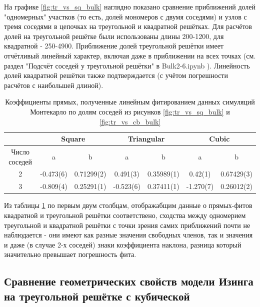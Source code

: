На графике \ref{fig:tr_vs_sq_bulk} наглядно показано сравнение приближений долей "одномерных" участков (то есть, долей мономеров с двумя соседями) и узлов с тремя соседями в цепочках на треугольной и квадратной решётках. Для расчётов долей на треугольной решётке были использованы длины 200-1200, для квадратной - 250-4900. Приближение долей треугольной решётки имеет отчётливый линейный характер, включая даже в приближении на всех точках (см. раздел "Подсчёт соседей у треугольной решётки" в Bulk2-6.ipynb \cite{web:ProjectMagnetRepos} ). Линейность долей квадратной решётки также подтверждается (с учётом погрешности расчётов с наибольшей длиной). 

\begin{table}[]
    \centering
    \begin{tabular}{|c|c|c|c|c|c|c|} \hline
        & \multicolumn{2}{|c|}{Square} & \multicolumn{2}{|c|}{Triangular} & \multicolumn{2}{|c|}{Cubic} \\ \hline
        Число соседей & a & b & a & b & a & b \\ \hline
        2 & -0.473(6) & 0.71299(2) & 0.491(3) & 0.35989(1) & 0.42(1) & 0.67429(3) \\ \hline
        3 & -0.809(4) & 0.25291(1) & -0.523(6) & 0.37411(1) & -1.270(7) & 0.26012(2) \\ \hline
    \end{tabular}
    \caption{Коэффициенты прямых, полученные линейным фитированием данных симуляций Монтекарло по долям соседей из рисунков \ref{fig:tr_vs_sq_bulk} и \ref{fig:tr_vs_cb_bulk}}
    \label{tab:fit_coeff}
\end{table}

Из таблицы \ref{tab:fit_coeff} по первым двум столбцам, отображабщим данные о прямых-фитов квадратной и треугольной решётки соответствено, сходства между одномерием треугольной и квадратной решётки с точки зрения самих приближений почти не наблюдается - они имеют как разные значения свободных членов, так и значения и даже (в случае 2-х соседей) знаки коэффициента наклона, разница который значительно превышает погрешность фита.



\subsection{Сравнение геометрических свойств модели Изинга на треугольной решётке с кубической}

